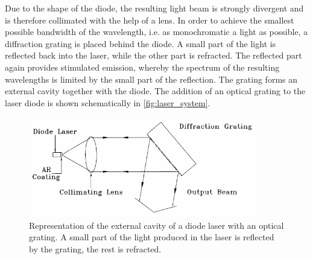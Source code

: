 Due to the shape of the diode, the resulting light beam is strongly divergent and is therefore collimated with the help of a lens.
In order to achieve the smallest possible bandwidth of the wavelength,
i.e. as monochromatic a light as possible,
a diffraction grating is placed behind the diode.
A small part of the light is reflected back into the laser,
while the other part is refracted.
The reflected part again provides stimulated emission,
whereby the spectrum of the resulting wavelengths is limited by the small part of the reflection.
The grating forms an external cavity together with the diode.
The addition of an optical grating to the laser diode is shown schematically in \autoref{fig:laser_system}.
\begin{figure}
    \centering
    \includegraphics[width=0.9\textwidth]{content/img/p8_Fig4.png}
    \caption{
        Representation of the external cavity of a diode laser with an optical grating.
        A small part of the light produced in the laser is reflected by the grating, the rest is refracted.
        \cite{versuchsanleitung}
    }
    \label{fig:laser_system}
\end{figure}

